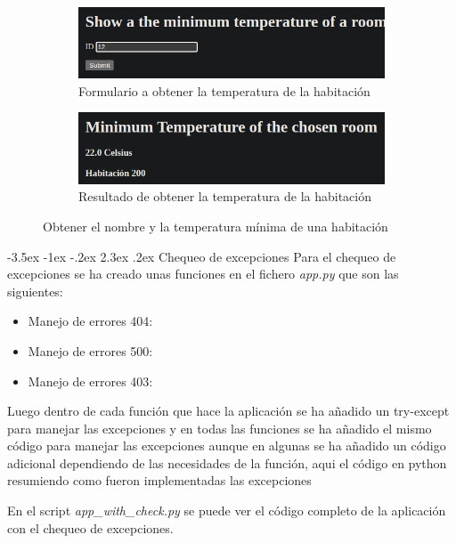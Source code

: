 \documentclass[11pt]{report}
\makeatletter
\renewcommand\chapter{\@startsection{chapter}{0}{\z@}%
    {-3.5ex \@plus -1ex \@minus -.2ex}%
    {2.3ex \@plus.2ex}%
    {\normalfont\Large\bfseries}}
\makeatother
\begin{document}
\begin{figure}[H]
  \begin{subfigure}{0.5\textwidth}
    \centering
    \includegraphics[scale=0.34]{img/min_temperature.png}
    \caption{Formulario a obtener la temperatura de la habitación}
  \end{subfigure}%
  \begin{subfigure}{0.5\textwidth}
    \centering
    \includegraphics[scale=0.34]{img/result_min_temperature.png}
    \caption{Resultado de obtener la temperatura de la habitación}
  \end{subfigure}
  \caption{Obtener el nombre y la temperatura mínima de una habitación}
\end{figure}

\cleardoublepage

\chapter{Chequeo de excepciones}
Para el chequeo de excepciones se ha creado unas funciones en el fichero \emph{app.py} que son las siguientes:
\begin{itemize}
  \item Manejo de errores 404: 
\lstset{style=mystyle}


  \item Manejo de errores 500:
\lstset{style=mystyle}


  \item Manejo de errores 403:
\lstset{style=mystyle}

\end{itemize}

Luego dentro de cada función que hace la aplicación se ha añadido un try-except para manejar las excepciones y en todas 
las funciones se ha añadido el mismo código para manejar las excepciones aunque en algunas se ha añadido un código adicional
dependiendo de las necesidades de la función, aqui el código en python resumiendo como fueron implementadas las excepciones
\lstset{style=mystyle}


En el script \emph{app\_with\_check.py} se puede ver el código completo de la aplicación con el chequeo de excepciones.
\end{document}
